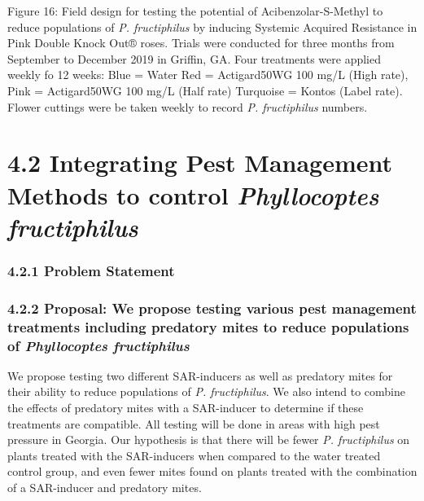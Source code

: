 \documentclass[12pt,final,CPage]{ufthesis}
\begin{document}
{  Figure 16: Field design for testing the potential of Acibenzolar-S-Methyl to reduce populations of \emph{P. fructiphilus} by inducing Systemic Acquired Resistance in Pink Double Knock Out® roses. Trials were conducted for three months from September to December 2019 in Griffin, GA. Four treatments were applied weekly fo 12 weeks: Blue = Water Red = Actigard50WG 100 mg/L (High rate), Pink = Actigard50WG 100 mg/L (Half rate) Turquoise = Kontos (Label rate). Flower cuttings were be taken weekly to record \emph{P. fructiphilus} numbers.

  \hypertarget{ipm-trials}{%
  \section{\texorpdfstring{4.2 Integrating Pest Management Methods to control \emph{Phyllocoptes fructiphilus}}{4.2 Integrating Pest Management Methods to control Phyllocoptes fructiphilus}}\label{ipm-trials}}

  \hypertarget{problem-statement-3}{%
  \subsubsection{4.2.1 Problem Statement}\label{problem-statement-3}}

  \hypertarget{proposal-we-propose-testing-various-pest-management-treatments-including-predatory-mites-to-reduce-populations-of-phyllocoptes-fructiphilus}{%
  \subsubsection{\texorpdfstring{4.2.2 Proposal: We propose testing various pest management treatments including predatory mites to reduce populations of \emph{Phyllocoptes fructiphilus}}{4.2.2 Proposal: We propose testing various pest management treatments including predatory mites to reduce populations of Phyllocoptes fructiphilus}}\label{proposal-we-propose-testing-various-pest-management-treatments-including-predatory-mites-to-reduce-populations-of-phyllocoptes-fructiphilus}}

  We propose testing two different SAR-inducers as well as predatory mites for their ability to reduce populations of \emph{P. fructiphilus}. We also intend to combine the effects of predatory mites with a SAR-inducer to determine if these treatments are compatible. All testing will be done in areas with high pest pressure in Georgia. Our hypothesis is that there will be fewer \emph{P. fructiphilus} on plants treated with the SAR-inducers when compared to the water treated control group, and even fewer mites found on plants treated with the combination of a SAR-inducer and predatory mites.

}
\end{document}
